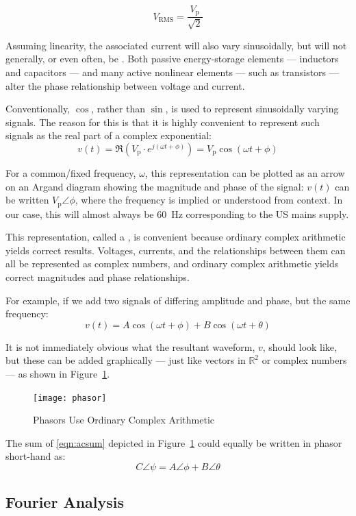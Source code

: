 \documentclass[11pt]{article}
\newcommand*\gf{60~\unit{Hz}\xspace}
\begin{document}
\[
V_\mathrm{RMS} = \frac{V_\mathrm{p}}{\sqrt{2}}
\]

Assuming linearity, the associated current will also vary
sinusoidally, but will not generally, or even often, be
. Both passive energy-storage elements --- inductors
and capacitors --- and many active nonlinear elements --- such as
transistors --- alter the phase relationship between voltage and
current.

Conventionally, $\cos$, rather than $\sin$, is used to represent
sinusoidally varying signals. The reason for this is that it is highly
convenient to represent such signals as the real part of a complex
exponential:
\[
v(t) = \Re(V_\mathrm{p}\cdot e^{j(\omega t+\phi)}) = V_\mathrm{p}\cos(\omega t+\phi)
\]

For a common/fixed frequency, $\omega$, this representation can be
plotted as an arrow on an Argand diagram showing the magnitude and
phase of the signal: $v(t)$ can be written $V_\mathrm{p}\angle\phi$,
where the frequency is implied or understood from context. In our
case, this will almost always be \gf corresponding to the US
mains supply.

This representation, called a , is convenient because
ordinary complex arithmetic yields correct results. Voltages,
currents, and the relationships between them can all be represented as
complex numbers, and ordinary complex arithmetic yields correct
magnitudes and phase relationships.

For example, if we add two signals of differing amplitude and phase,
but the same frequency:
\begin{equation}
\label{eqn:acsum}
v(t) = A\cos(\omega t + \phi) + B\cos(\omega t + \theta)
\end{equation}

It is not immediately obvious what the resultant waveform, $v$, should
look like, but these can be added graphically --- just like vectors in
$\mathbb{R}^2$ or complex numbers --- as shown in
Figure~\ref{fig:phasor}.

\begin{figure}[!ht]
  \centering
  \texttt{[image: phasor]}
  \caption{Phasors Use Ordinary Complex Arithmetic}
  \label{fig:phasor}
\end{figure}

The sum of \eqref{eqn:acsum} depicted in Figure~\ref{fig:phasor} could
equally be written in phasor short-hand as:
\[
C\angle\psi = A\angle\phi + B\angle\theta
\]


\subsection{Fourier Analysis}
\end{document}
